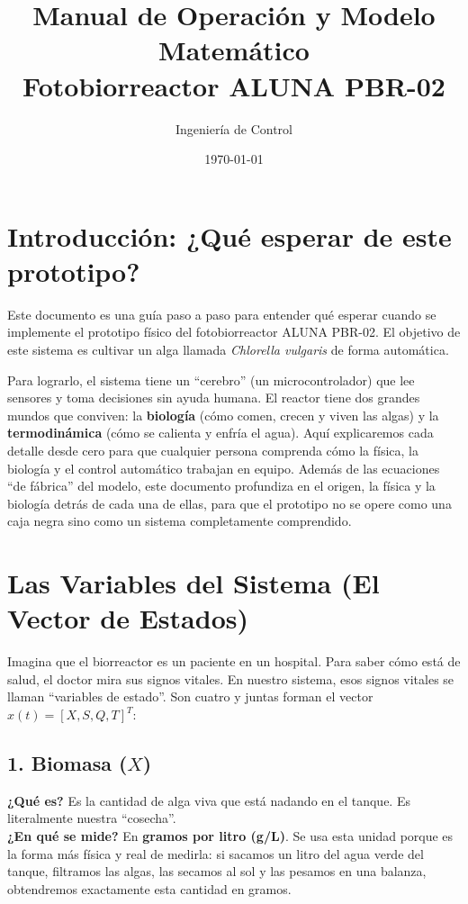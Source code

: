 \documentclass[11pt,a4paper]{article}
\title{Manual de Operación y Modelo Matemático \\ Fotobiorreactor ALUNA PBR-02}
\author{Ingeniería de Control}
\date{\today}
\begin{document}
\maketitle

\section*{Introducción: ¿Qué esperar de este prototipo?}
Este documento es una guía paso a paso para entender qué esperar cuando se implemente el prototipo físico del fotobiorreactor ALUNA PBR-02. El objetivo de este sistema es cultivar un alga llamada \textit{Chlorella vulgaris} de forma automática.

Para lograrlo, el sistema tiene un ``cerebro'' (un microcontrolador) que lee sensores y toma decisiones sin ayuda humana. El reactor tiene dos grandes mundos que conviven: la \textbf{biología} (cómo comen, crecen y viven las algas) y la \textbf{termodinámica} (cómo se calienta y enfría el agua). Aquí explicaremos cada detalle desde cero para que cualquier persona comprenda cómo la física, la biología y el control automático trabajan en equipo. Además de las ecuaciones ``de fábrica'' del modelo, este documento profundiza en el origen, la física y la biología detrás de cada una de ellas, para que el prototipo no se opere como una caja negra sino como un sistema completamente comprendido.

\tableofcontents
\newpage

\section{Las Variables del Sistema (El Vector de Estados)}
Imagina que el biorreactor es un paciente en un hospital. Para saber cómo está de salud, el doctor mira sus signos vitales. En nuestro sistema, esos signos vitales se llaman ``variables de estado''. Son cuatro y juntas forman el vector $x(t) = [X, S, Q, T]^T$:

\subsection{1. Biomasa ($X$)}
\textbf{¿Qué es?} Es la cantidad de alga viva que está nadando en el tanque. Es literalmente nuestra ``cosecha''.\\
\textbf{¿En qué se mide?} En \textbf{gramos por litro (g/L)}. Se usa esta unidad porque es la forma más física y real de medirla: si sacamos un litro del agua verde del tanque, filtramos las algas, las secamos al sol y las pesamos en una balanza, obtendremos exactamente esta cantidad en gramos.
\end{document}
